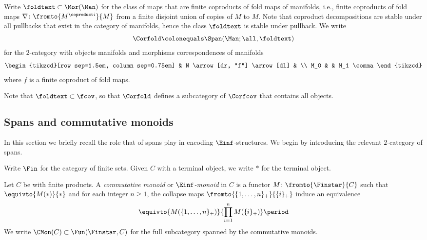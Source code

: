 \begin{example}
	Write $ \foldtext \subset \Mor(\Man) $ for the class of maps that are finite coproducts of fold maps of manifolds, i.e., finite coproducts of fold maps $ \nabla \colon \fromto{M^{\coproduct i}}{M} $ from a finite disjoint union of copies of $ M $ to $ M $.
	Note that coproduct decompositions are stable under all pullbacks that exist in the category of manifolds, hence the class $ \foldtext $ is stable under pullback.
	We write
	\begin{equation*}
		\Corfold \colonequals \Span(\Man;\all,\foldtext)
	\end{equation*}
	for the $ 2 $-category with objects manifolds and morphisms correspondences of manifolds 
	\begin{equation*}
		\begin{tikzcd}[row sep=1.5em, column sep=0.75em]
			& N \arrow[dr, "f"] \arrow[dl] & \\
			M_0 & & M_1 \comma
		\end{tikzcd}
	\end{equation*}
	where $ f $ is a finite coproduct of fold maps.

	Note that $ \foldtext \subset \fcov $, so that $ \Corfold $ defines a subcategory of $ \Corfcov $ that contains all objects.
\end{example}


\subsection{Spans and commutative monoids}\label{subsec:spansCMon}

In this section we briefly recall the role that \categories of spans play in encoding $ \Einf $-structures.
We begin by introducing the relevant $ 2 $-category of spans.

\begin{notation}
	Write $ \Fin $ for the category of finite sets.
	Given \acategory $ C $ with a terminal object, we write $ * $ for the terminal object.
\end{notation}

\begin{recollection}
	Let $ C $ be \acategory with finite products.
	A \textit{commutative monoid} or \textit{$ \Einf $-monoid} in $ C $ is a functor $ M \colon \fromto{\Finstar}{C} $ such that $ \equivto{M(*)}{*} $ and for each integer $ n \geq  1 $, the collapse maps $ \fromto{\{1,\ldots,n\}_+}{\{i\}_+} $ induce an equivalence
	\begin{equation*}
		\equivto{M(\{1,\ldots,n\}_+)}{\prod_{i=1}^n M(\{i\}_+)} \period
	\end{equation*}
	We write $ \CMon(C) \subset \Fun(\Finstar,C) $ for the full subcategory spanned by the commutative monoids.
\end{recollection}

